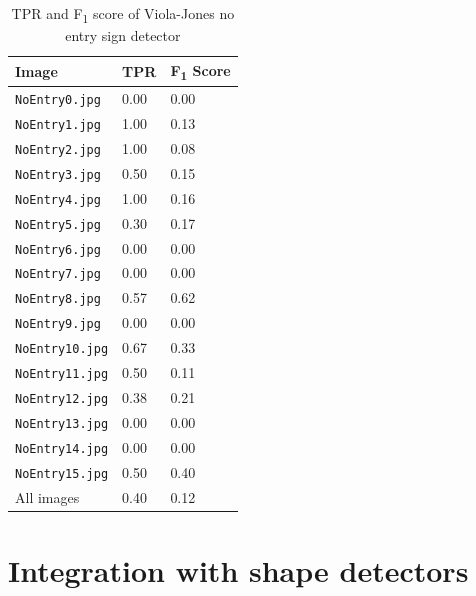 \documentclass[twocolumn, 10pt, a4paper]{article}
\begin{document}
\begin{table}[htbp]
  \begin{center}
  \caption{TPR and F\textsubscript{1} score of Viola-Jones no entry sign detector}\label{tab:vj}
  \begin{tabular}{l | l l} 
    \hline\hline
    Image&TPR&F\textsubscript{1} Score\\
    \hline
    \texttt{NoEntry0.jpg}&0.00&0.00\\ 
    \texttt{NoEntry1.jpg}&1.00&0.13\\ 
    \texttt{NoEntry2.jpg}&1.00&0.08\\ 
    \texttt{NoEntry3.jpg}&0.50&0.15\\ 
    \texttt{NoEntry4.jpg}&1.00&0.16\\ 
    \texttt{NoEntry5.jpg}&0.30&0.17\\ 
    \texttt{NoEntry6.jpg}&0.00&0.00\\ 
    \texttt{NoEntry7.jpg}&0.00&0.00\\
    \texttt{NoEntry8.jpg}&0.57&0.62\\ 
    \texttt{NoEntry9.jpg}&0.00&0.00\\ 
    \texttt{NoEntry10.jpg}&0.67&0.33\\ 
    \texttt{NoEntry11.jpg}&0.50&0.11\\ 
    \texttt{NoEntry12.jpg}&0.38&0.21\\ 
    \texttt{NoEntry13.jpg}&0.00&0.00\\ 
    \texttt{NoEntry14.jpg}&0.00&0.00\\ 
    \texttt{NoEntry15.jpg}&0.50&0.40\\ 
    \hdashline
    All images&0.40&0.12\\ 
    \hline
  \end{tabular}
  \end{center}
\end{table} 

\clearpage

\section{Integration with shape detectors}
\end{document}
